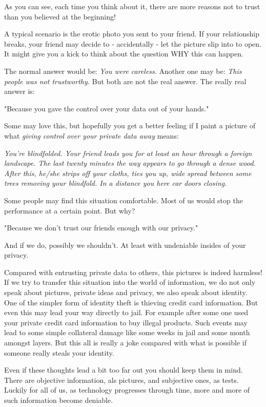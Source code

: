 \documentclass[twoside,a4paper,english,12pt,authoryear,openright]{book}
\begin{document}
As you can see, each time you think about it, there are more reasons not to trust than you believed at the beginning!

A typical scenario is the erotic photo you sent to your friend. If your relationship breaks, your friend may decide to - accidentally - let the picture slip into to open. It might give you a kick to think about the question WHY this can happen.

The normal answer would be: \textit{You were careless}. Another one may be: \textit{This people was not trustworthy.} But both are not the real answer. The really real answer is:

"Because you gave the control over your data out of your hands."

Some may love this, but hopefully you get a better feeling if I paint a picture of what \textit{giving control over your private data away} means:

\textit{You're blindfolded. Your friend leads you for at least an hour through a foreign landscape. The last twenty minutes the way appears to go through a dense wood. After this, he/she strips off your cloths, ties you up, wide spread between some trees removing your blindfold. In a distance you here car doors closing.}

Some people may find this situation comfortable. Most of us would stop the performance at a certain point. But why?

"Because we don't trust our friends enough with our privacy."

And if we do, possibly we shouldn't. At least with undeniable insides of your privacy.

Compared with entrusting private data to others, this pictures is indeed harmless! If we try to transfer this situation into the world of information, we do not only speak about pictures, private ideas and privacy, we also speak about identity. One of the simpler form of identity theft is thieving credit card information. But even this may lead your way directly to jail. For example after some one used your private credit card information to buy illegal products. Such events may lead to some simple collateral damage like some weeks in jail and some month amongst layers. But this all is really a joke compared with what is possible if someone really steals your identity.

Even if these thoughts lead a bit too far out you should keep them in mind. There are objective information, als pictures, and subjective ones, as tests. Luckily for all of us, as technology progresses through time, more and more of such information become deniable.
\end{document}
